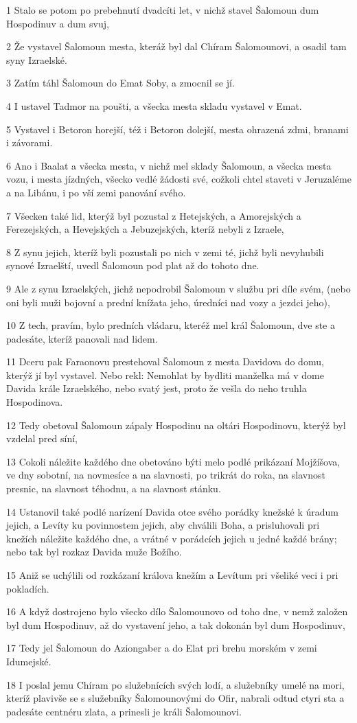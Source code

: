 \par 1 Stalo se potom po prebehnutí dvadcíti let, v nichž stavel Šalomoun dum Hospodinuv a dum svuj,
\par 2 Že vystavel Šalomoun mesta, kteráž byl dal Chíram Šalomounovi, a osadil tam syny Izraelské.
\par 3 Zatím táhl Šalomoun do Emat Soby, a zmocnil se jí.
\par 4 I ustavel Tadmor na poušti, a všecka mesta skladu vystavel v Emat.
\par 5 Vystavel i Betoron horejší, též i Betoron dolejší, mesta ohrazená zdmi, branami i závorami.
\par 6 Ano i Baalat a všecka mesta, v nichž mel sklady Šalomoun, a všecka mesta vozu, i mesta jízdných, všecko vedlé žádosti své, cožkoli chtel staveti v Jeruzaléme a na Libánu, i po vší zemi panování svého.
\par 7 Všecken také lid, kterýž byl pozustal z Hetejských, a Amorejských a Ferezejských, a Hevejských a Jebuzejských, kteríž nebyli z Izraele,
\par 8 Z synu jejich, kteríž byli pozustali po nich v zemi té, jichž byli nevyhubili synové Izraelští, uvedl Šalomoun pod plat až do tohoto dne.
\par 9 Ale z synu Izraelských, jichž nepodrobil Šalomoun v službu pri díle svém, (nebo oni byli muži bojovní a prední knížata jeho, úredníci nad vozy a jezdci jeho),
\par 10 Z tech, pravím, bylo predních vládaru, kteréž mel král Šalomoun, dve ste a padesáte, kteríž panovali nad lidem.
\par 11 Dceru pak Faraonovu prestehoval Šalomoun z mesta Davidova do domu, kterýž jí byl vystavel. Nebo rekl: Nemohlat by bydliti manželka má v dome Davida krále Izraelského, nebo svatý jest, proto že vešla do neho truhla Hospodinova.
\par 12 Tedy obetoval Šalomoun zápaly Hospodinu na oltári Hospodinovu, kterýž byl vzdelal pred síní,
\par 13 Cokoli náležite každého dne obetováno býti melo podlé prikázaní Mojžíšova, ve dny sobotní, na novmesíce a na slavnosti, po trikrát do roka, na slavnost presnic, na slavnost téhodnu, a na slavnost stánku.
\par 14 Ustanovil také podlé narízení Davida otce svého porádky knežské k úradum jejich, a Levíty ku povinnostem jejich, aby chválili Boha, a prisluhovali pri knežích náležite každého dne, a vrátné v porádcích jejich u jedné každé brány; nebo tak byl rozkaz Davida muže Božího.
\par 15 Aniž se uchýlili od rozkázaní králova knežím a Levítum pri všeliké veci i pri pokladích.
\par 16 A když dostrojeno bylo všecko dílo Šalomounovo od toho dne, v nemž založen byl dum Hospodinuv, až do vystavení jeho, a tak dokonán byl dum Hospodinuv,
\par 17 Tedy jel Šalomoun do Aziongaber a do Elat pri brehu morském v zemi Idumejské.
\par 18 I poslal jemu Chíram po služebnících svých lodí, a služebníky umelé na mori, kteríž plavivše se s služebníky Šalomounovými do Ofir, nabrali odtud ctyri sta a padesáte centnéru zlata, a prinesli je králi Šalomounovi.

